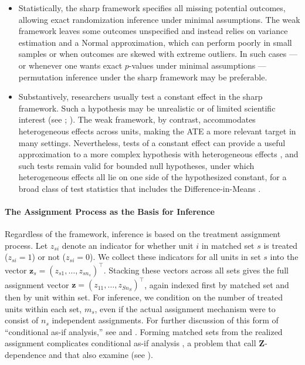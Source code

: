 \documentclass[twoside,11pt]{article}
\begin{document}
\begin{itemize}
\item
  Statistically, the sharp framework specifies all missing potential
  outcomes, allowing exact randomization inference under minimal
  assumptions. The weak framework leaves some outcomes unspecified and
  instead relies on variance estimation and a Normal approximation,
  which can perform poorly in small samples or when outcomes are skewed
  with extreme outliers. In such cases --- or whenever one wants exact
  \(p\)-values under minimal assumptions --- permutation inference under
  the sharp framework may be preferable.
\item
  Substantively, researchers usually test a constant effect in the sharp
  framework. Such a hypothesis may be unrealistic or of limited
  scientific interest (see \citealp[p.~961]{gelman2011}; \citealp{caugheyetal2023}). The weak
  framework, by contrast, accommodates heterogeneous effects across
  units, making the ATE a more relevant target in many settings.
  Nevertheless, tests of a constant effect can provide a useful
  approximation to a more complex hypothesis with heterogeneous effects
  \citep[pp.~44--46]{rosenbaum2010}, and such tests remain valid for
  bounded null hypotheses, under which heterogeneous effects all lie on
  one side of the hypothesized constant, for a broad class of test
  statistics that includes the Difference-in-Means
  \citep[Theorems~1--2]{caugheyetal2023}.
\end{itemize}

\paragraph{The Assignment Process as the Basis for
Inference}\label{the-assignment-process-as-the-basis-for-inference}

Regardless of the framework, inference is based on the treatment
assignment process. Let \(z_{si}\) denote an indicator for whether unit
\(i\) in matched set \(s\) is treated (\(z_{si} = 1\)) or not
(\(z_{si} = 0\)). We collect these indicators for all units in set \(s\)
into the vector \(\bm{z}_s = (z_{s1}, \ldots, z_{sn_s})^{\top}\).
Stacking these vectors across all sets gives the full assignment vector
\(\bm{z} = (z_{11}, \ldots, z_{Sn_S})^{\top}\), again indexed first by
matched set and then by unit within set. For inference, we condition on
the number of treated units within each set, \(m_s\), even if the actual
assignment mechanism were to consist of \(n_s\) independent assignments.
For further discussion of this form of ``conditional as-if analysis,''
see \citet{pashleyetal2021} and \citet[pp.~289--290, fn.~15]{rosenbaum2017}.
Forming matched sets from the realized assignment complicates
conditional as-if analysis \citep[Section~5]{pashleyetal2021}, a problem
that \citet{pimentelhuang2024} call \(\bm{Z}\)-dependence and that
\citet{pimentelyu2024} also examine (see
).
\end{document}
